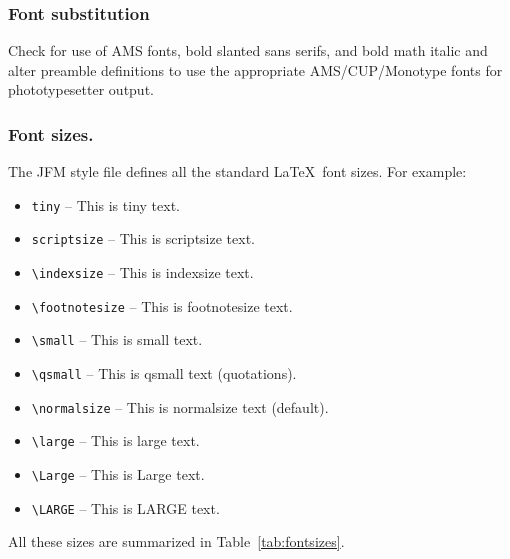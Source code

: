 \subsubsection{Font substitution}
Check for use of AMS fonts, bold slanted sans serifs, and bold math italic
and alter preamble definitions to use the appropriate AMS/CUP/Monotype
fonts for phototypesetter output.

\subsubsection{Font sizes.}
The JFM style file defines all the standard \LaTeX\ font sizes. For example:
\begin{itemize}
  \item \verb"tiny" -- {\tiny This is tiny text.}
  \item \verb"scriptsize" -- {\scriptsize This is scriptsize text.}
  \item \verb"\indexsize" -- {\indexsize This is indexsize text.}
  \item \verb"\footnotesize" -- {\footnotesize This is footnotesize text.}
  \item \verb"\small" -- {\small This is small text.}
  \item \verb"\qsmall"  -- {\qsmall This is qsmall text (quotations).}
  \item \verb"\normalsize" -- This is normalsize text (default).
  \item \verb"\large" -- {\large This is large text.}
  \item \verb"\Large" -- {\Large This is Large text.}
  \item \verb"\LARGE" -- {\LARGE This is LARGE text.}
\end{itemize}
%
All these sizes are summarized in Table~\ref{tab:fontsizes}.
%
